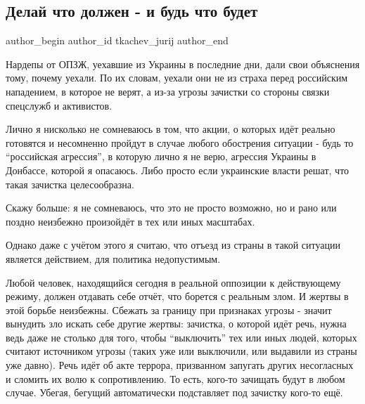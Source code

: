  
 
 
 
 
 
\subsection{Делай что должен - и будь что будет}
\label{sec:16_02_2022.tg.tkachev_jurij.2.delaj_chto_dolzhen}
 
\ifcmt
 author_begin
   author_id tkachev_jurij
 author_end
\fi

Нардепы от ОПЗЖ, уехавшие из Украины в последние дни, дали свои объяснения
тому, почему уехали. По их словам, уехали они не из страха перед российским
нападением, в которое не верят, а из-за угрозы зачистки со стороны связки
спецслужб и активистов. 

Лично я нисколько не сомневаюсь в том, что акции, о которых идёт реально
готовятся и несомненно пройдут в случае любого обострения ситуации - будь то
\enquote{российская агрессия}, в которую лично я не верю, агрессия Украины в
Донбассе, которой я опасаюсь. Либо просто если украинские власти решат, что
такая зачистка целесообразна. 

Скажу больше: я не сомневаюсь, что это не просто возможно, но и рано или поздно
неизбежно произойдёт в тех или иных масштабах. 

Однако даже с учётом этого я считаю, что отъезд из страны в такой ситуации
является действием, для политика недопустимым.

Любой человек, находящийся сегодня в реальной оппозиции к действующему режиму,
должен отдавать себе отчёт, что борется с реальным злом. И жертвы в этой борьбе
неизбежны. Сбежать за границу при признаках угрозы - значит вынудить зло искать
себе другие жертвы: зачистка, о которой идёт речь, нужна ведь даже не столько
для того, чтобы \enquote{выключить} тех или иных людей, которых считают источником
угрозы (таких уже или выключили, или выдавили из страны уже давно). Речь идёт
об акте террора, призванном запугать других несогласных и сломить их волю к
сопротивлению. То есть, кого-то зачищать будут в любом случае. Убегая, бегущий
автоматически подставляет под зачистку кого-то ещё. 

